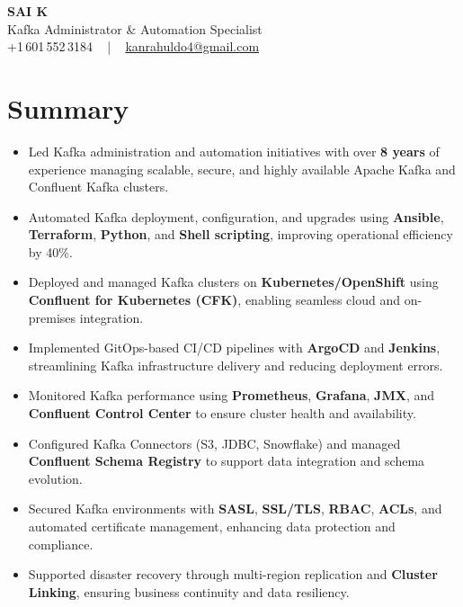 \documentclass[letterpaper,11pt]{article}
\newcommand{\resumeItem}[1]{
  \item\footnotesize{
    {#1 \vspace{-2pt}}
  }
}
\newcommand{\resumeItemListStart}{\begin{itemize}[leftmargin=*]}
\newcommand{\resumeItemListEnd}{\end{itemize}\vspace{-5pt}}
\begin{document}
\begin{center}
    {\fontsize{14pt}{12pt}\selectfont \textbf{\MakeUppercase{Sai K}}}\\ \vspace{2pt}
    \fontsize{10pt}{12pt}\selectfont Kafka Administrator \& Automation Specialist\\ \vspace{2pt}
    \fontsize{10pt}{12pt}\selectfont +1\,601\,552\,3184 ~ | ~
    \href{mailto:kanrahuldo4@gmail.com}{kanrahuldo4@gmail.com}
    \vspace{-10pt}
\end{center}

\section{Summary}
\fontsize{9pt}{10pt}\selectfont
\resumeItemListStart
  \resumeItem{Led Kafka administration and automation initiatives with over \textbf{8 years} of experience managing scalable, secure, and highly available Apache Kafka and Confluent Kafka clusters.}
  \resumeItem{Automated Kafka deployment, configuration, and upgrades using \textbf{Ansible}, \textbf{Terraform}, \textbf{Python}, and \textbf{Shell scripting}, improving operational efficiency by 40\%.}
  \resumeItem{Deployed and managed Kafka clusters on \textbf{Kubernetes/OpenShift} using \textbf{Confluent for Kubernetes (CFK)}, enabling seamless cloud and on-premises integration.}
  \resumeItem{Implemented GitOps-based CI/CD pipelines with \textbf{ArgoCD} and \textbf{Jenkins}, streamlining Kafka infrastructure delivery and reducing deployment errors.}
  \resumeItem{Monitored Kafka performance using \textbf{Prometheus}, \textbf{Grafana}, \textbf{JMX}, and \textbf{Confluent Control Center} to ensure cluster health and availability.}
  \resumeItem{Configured Kafka Connectors (S3, JDBC, Snowflake) and managed \textbf{Confluent Schema Registry} to support data integration and schema evolution.}
  \resumeItem{Secured Kafka environments with \textbf{SASL}, \textbf{SSL/TLS}, \textbf{RBAC}, \textbf{ACLs}, and automated certificate management, enhancing data protection and compliance.}
  \resumeItem{Supported disaster recovery through multi-region replication and \textbf{Cluster Linking}, ensuring business continuity and data resiliency.}
\resumeItemListEnd
\vspace{-6pt}

\end{document}
